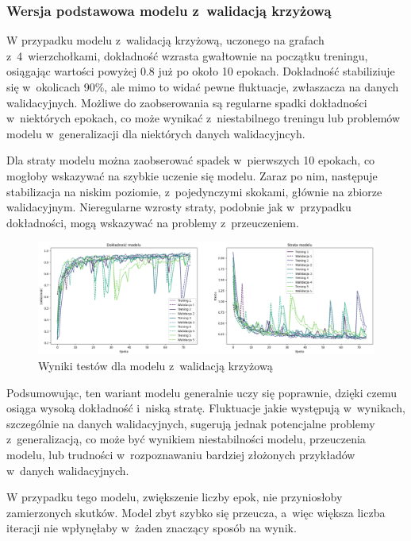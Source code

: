 \subsubsection{Wersja podstawowa modelu z~walidacją krzyżową}

W przypadku modelu z~walidacją krzyżową, uczonego na grafach z~4~wierzchołkami,
dokładność wzrasta gwałtownie na początku treningu,
osiągając wartości powyżej 0.8 już po około 10 epokach.
Dokładność stabiliziuje się w~okolicach 90\%, ale mimo to widać pewne fluktuacje, zwłaszacza na danych walidacyjnych.
Możliwe do zaobserowania są regularne spadki dokładności w~niektórych epokach,
co może wynikać z~niestabilnego treningu lub problemów modelu w~generalizacji dla niektórych danych walidacyjncyh.

Dla straty modelu można zaobserować spadek w~pierwszych 10 epokach, co mogłoby wskazywać na szybkie uczenie się modelu.
Zaraz po nim, następuje stabilizacja na niskim poziomie, z~pojedynczymi skokami, głównie na zbiorze walidacyjnym.
Nieregularne wzrosty straty, podobnie jak w~przypadku dokładności, mogą wskazywać na problemy z~przeuczeniem.

\begin{figure}[ht]
	\centering
	\includegraphics[width=15.5cm]{resources/tests/images/v3/crossvalid_img.png}
	\caption{Wyniki testów dla modelu z~walidacją krzyżową}
	\label{Fig:tests-cv-0a}
\end{figure}
\FloatBarrier

Podsumowując, ten wariant modelu generalnie uczy się poprawnie, dzięki czemu osiąga wysoką dokładność i~niską stratę.
Fluktuacje jakie występują w~wynikach, szczególnie na danych walidacyjnych,
sugerują jednak potencjalne problemy z~generalizacją, co może być wynikiem niestabilności modelu,
przeuczenia modelu, lub trudności w~rozpoznawaniu bardziej złożonych przykładów w~danych walidacyjnych.

W przypadku tego modelu, zwiększenie liczby epok, nie przyniosłoby zamierzonych skutków.
Model zbyt szybko się przeucza, a~więc większa liczba iteracji nie wpłynęłaby w~żaden znaczący sposób na wynik.

